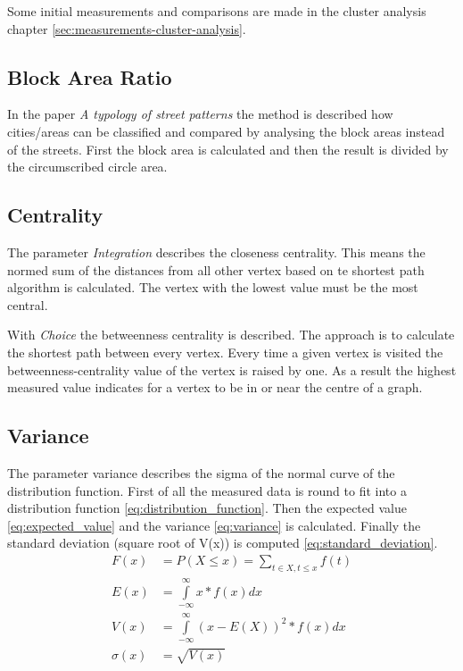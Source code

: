 Some initial measurements and comparisons are made in the cluster analysis chapter \ref{sec:measurements-cluster-analysis}.

\subsection{Block Area Ratio}
In the paper \textit{A typology of street patterns}\citep{blockArea:2014} the method is described how cities/areas can be classified and compared by analysing the block areas instead of the streets. First the block area is calculated and then the result is divided by the circumscribed circle area.

\subsection{Centrality}
The parameter \textit{Integration} describes the closeness centrality. This means the normed sum of the distances from all other vertex based on te shortest path algorithm is calculated. The vertex with the lowest value must be the most central.

With \textit{Choice} the betweenness centrality is described. The approach is to calculate the shortest path between every vertex. Every time a given vertex is visited the betweenness-centrality value of the vertex is raised by one. As a result the highest measured value indicates for a vertex to be in or near the centre of a graph.

\subsection{Variance}
The parameter variance describes the sigma of the normal curve of the distribution function.
First of all the measured data is round to fit into a distribution function \ref{eq:distribution_function}. Then the expected value \ref{eq:expected_value} and the variance \ref{eq:variance} is calculated. Finally the standard deviation (square root of V(x)) is computed \ref{eq:standard_deviation}.
\begin{align}
\label{eq:distribution_function} 
F(x) &= P(X \leq x) =  \sum_{t\in{X}, t\leq{x}}{f(t)} \\
\label{eq:expected_value} 
E(x) &= \int\limits_{-\infty}^\infty x * f(x)dx \\
\label{eq:variance} 
V(x) &= \int\limits_{-\infty}^\infty (x - E(X))^2 * f(x)dx \\
\label{eq:standard_deviation} 
\sigma(x) &= \sqrt{V(x)}
\end{align}